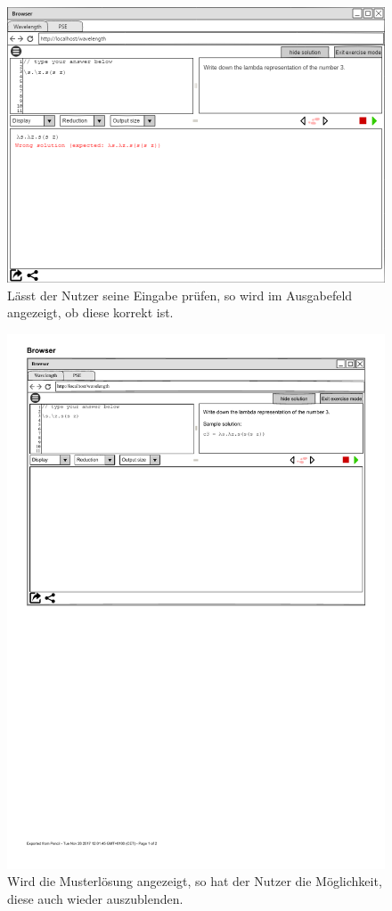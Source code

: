 \documentclass[parskip=full,11pt,twoside]{scrartcl}
\begin{document}
{\begin{figure}[H]
	\centering
	\includegraphics[width=\textwidth]{img/exercise_mode_solution_check.png}
	\caption{\label{fig:solutionCheck}Lässt der Nutzer seine Eingabe prüfen, so wird im Ausgabefeld angezeigt, ob diese korrekt ist.}
\end{figure}


\begin{figure}[H]
	\centering
	\includegraphics[width=\textwidth]{img/exerciseModeSolution}
	\caption{\label{fig:showSolution}Wird die Musterlösung angezeigt, so hat der Nutzer die Möglichkeit, diese auch wieder auszublenden.}
\end{figure}


}
\end{document}

